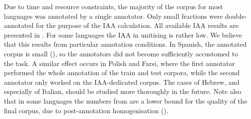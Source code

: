 \documentclass[output=paper,modfonts]{langscibook}
\begin{document}
Due to time and resource constraints, the majority of the corpus for most languages was annotated by a single annotator. %
Only small fractions were double-annotated for the purpose of the IAA calculation. 
All available IAA results are presented in .
For some languages the IAA in unitising is rather low. We believe that this results from particular annotation conditions. In Spanish, the annotated corpus is small (), %
so the annotators did not become sufficiently accustomed to the task. A similar effect occurs in Polish and Farsi, where the first annotator performed the whole annotation of the train and test corpora, while the second annotator only worked on the IAA-dedicated corpus. The cases of Hebrew, and especially of Italian, should be studied more thoroughly in the future. Note also that in some languages the numbers from  are a lower bound for the quality of the final corpus, due to post-annotation homogenisation  (). 
\end{document}
